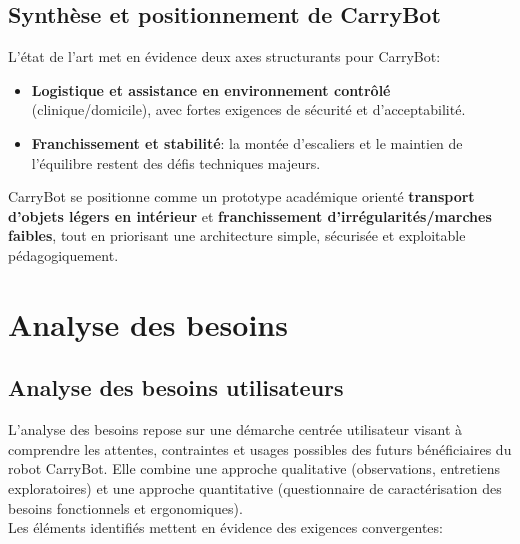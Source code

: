 \documentclass[12pt,a4paper]{article}
\begin{document}
\subsection{Synthèse et positionnement de CarryBot}

L’état de l’art met en évidence deux axes structurants pour CarryBot:
\begin{itemize}
    \item \textbf{Logistique et assistance en environnement contrôlé} (clinique/domicile), avec fortes exigences de sécurité et d’acceptabilité.
    \item \textbf{Franchissement et stabilité}: la montée d’escaliers et le maintien de l’équilibre restent des défis techniques majeurs.
\end{itemize}

CarryBot se positionne comme un prototype académique orienté \textbf{transport d’objets légers en intérieur} et \textbf{franchissement d’irrégularités/marches faibles}, tout en priorisant une architecture simple, sécurisée et exploitable pédagogiquement.

\section{Analyse des besoins}
\subsection{Analyse des besoins utilisateurs}

L’analyse des besoins repose sur une démarche centrée utilisateur visant à comprendre
les attentes, contraintes et usages possibles des futurs bénéficiaires du robot CarryBot.
Elle combine une approche qualitative (observations, entretiens exploratoires) et une
approche quantitative (questionnaire de caractérisation des besoins fonctionnels et
ergonomiques).\\

Les éléments identifiés mettent en évidence des exigences convergentes:
\end{document}
